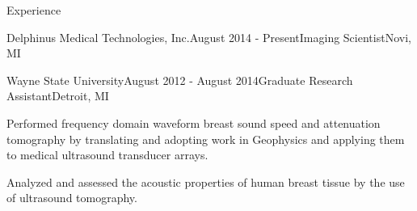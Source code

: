\documentclass{resume} %
\begin{document}
\begin{rSection}{Experience}
\begin{rSubsection}{Delphinus Medical Technologies, Inc.}{August 2014 - Present}{Imaging Scientist}{Novi, MI}
\end{rSubsection}


\begin{rSubsection}{Wayne State University}{August 2012 - August 2014}{Graduate Research Assistant}{Detroit, MI}
\item Performed frequency domain waveform breast sound speed and attenuation tomography by translating and adopting work in Geophysics and applying them to medical ultrasound  transducer arrays.
\item Analyzed and assessed the acoustic properties of human breast tissue by the use of ultrasound tomography.
\end{rSubsection}


\end{rSection}
\end{document}
